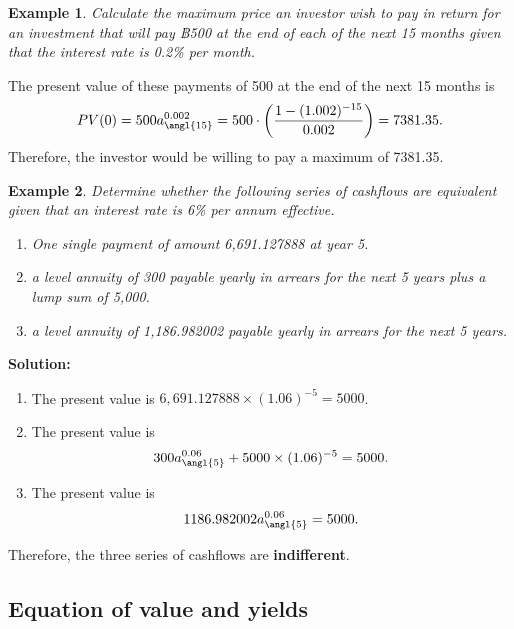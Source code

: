 \documentclass[
]{book}
\theoremstyle{definition}
\theoremstyle{definition}
\newtheorem{example}{Example}[chapter]
\theoremstyle{definition}
\theoremstyle{definition}
\theoremstyle{remark}
\begin{document}
\begin{example}
\emph{Calculate the maximum price an investor wish to pay in return for an
investment that will pay ฿500 at the end of each of the next 15 months
given that the interest rate is 0.2\% per month.}
\end{example}

The present value of these payments of 500 at the end of the next 15
months is
\[PV(0) = 500 a^{0.002}_{\angl{15}} =  500 \cdot \left(  \frac{1 - (1.002)^{-15}}{0.002}  \right)   = 7381.35.\]
Therefore, the investor would be willing to pay a maximum of 7381.35.

\begin{example}

\emph{Determine whether the following series of cashflows are equivalent
given that an interest rate is 6\% per annum effective.}

\begin{enumerate}
\def\labelenumi{\arabic{enumi}.}
\item
  \emph{One single payment of amount 6,691.127888 at year 5.}
\item
  \emph{a level annuity of 300 payable yearly in arrears for the next 5
  years plus a lump sum of 5,000.}
\item
  \emph{a level annuity of 1,186.982002 payable yearly in arrears for the
  next 5 years.}
\end{enumerate}

\end{example}

\textbf{Solution:}

\begin{enumerate}
\def\labelenumi{\arabic{enumi}.}
\item
  The present value is \(6,691.127888 \times (1.06)^{-5} = 5000\).
\item
  The present value is
  \[300 a^{0.06}_{\angl{5}}   + 5000 \times (1.06)^{-5}  = 5000.\]
\item
  The present value is \[1186.982002 a^{0.06}_{\angl{5}}     = 5000.\]
\end{enumerate}

Therefore, the three series of cashflows are \textbf{indifferent}.

\hypertarget{equation-of-value-and-yields}{%
\subsection{Equation of value and yields}\label{equation-of-value-and-yields}}
\end{document}
